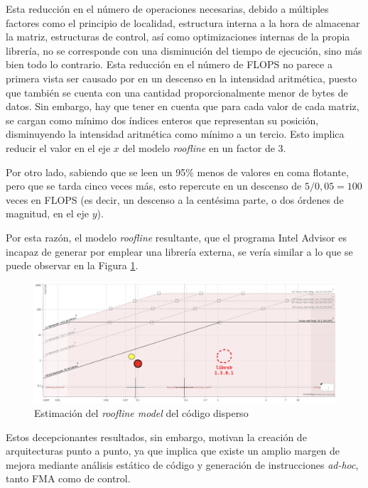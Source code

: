 Esta reducción en el número de operaciones necesarias, debido a múltiples factores como el principio de localidad, estructura interna a la hora de almacenar la matriz, estructuras de control, así como optimizaciones internas de la propia librería, no se corresponde con una disminución del tiempo de ejecución, sino más bien todo lo contrario. Esta reducción en el número de FLOPS no parece a primera vista ser causado por en un descenso en la intensidad aritmética, puesto que también se cuenta con una cantidad proporcionalmente menor de bytes de datos. Sin embargo, hay que tener en cuenta que para cada valor de cada matriz, se cargan como mínimo dos índices enteros que representan su posición, disminuyendo la intensidad aritmética como mínimo a un tercio. Esto implica reducir el valor en el eje $x$ del modelo \textit{roofline} en un factor de 3.

Por otro lado, sabiendo que se leen un 95\% menos de valores en coma flotante, pero que se tarda cinco veces más, esto repercute en un descenso de $5/0,05=100$ veces en FLOPS (es decir, un descenso a la centésima parte, o dos órdenes de magnitud, en el eje $y$).

Por esta razón, el modelo \textit{roofline} resultante, que el programa Intel Advisor es incapaz de generar por emplear una librería externa, se vería similar a lo que se puede observar en la Figura \ref{fig:roofline_sparse_estimado}.

\begin{figure}[h!]
    \centering
    \includegraphics[width=\textwidth]{img/rooflines/roofline_sparse_estimado.png}
    \caption{Estimación del \textit{roofline model} del código disperso}
    \label{fig:roofline_sparse_estimado}
\end{figure}

Estos decepcionantes resultados, sin embargo, motivan la creación de arquitecturas punto a punto, ya que implica que existe un amplio margen de mejora mediante análisis estático de código y generación de instrucciones \textit{ad-hoc}, tanto FMA como de control.


